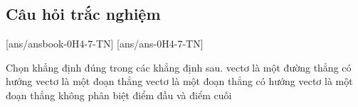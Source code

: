 				
		
		
\subsection{Câu hỏi trắc nghiệm}
[ans/ansbook-0H4-7-TN]
[ans/ans-0H4-7-TN]

\setcounter{ex}{0}



\begin{ex}%
	Chọn khẳng định đúng trong các khẳng định sau.
	\choice
	{vectơ là một đường thẳng có hướng}
	{vectơ là một đoạn thẳng}
	{\True vectơ là một đoạn thẳng có hướng}
	{vectơ là một đoạn thẳng không phân biệt điểm đầu và điểm cuối}
\end{ex}




